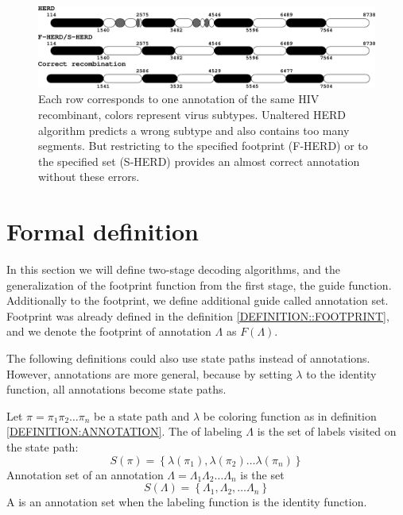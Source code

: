 \begin{figure}
\begin{center}
\includegraphics[width=14cm]{../figures/jcss/happyStory.pdf}
\end{center}
\caption[Example of annotation with systematic error.]{ 
Each row corresponds to one annotation of the same HIV recombinant, colors
represent virus subtypes. Unaltered HERD algorithm predicts a wrong
subtype and also contains too many segments. But restricting to the specified
footprint (F-HERD) or to the specified set (S-HERD) provides an almost correct
annotation without these errors.  }\label{FIGURE:HERD_BAD} 
\end{figure}

\section{Formal definition}
In this section we will define two-stage decoding algorithms, and the
generalization of the footprint function from the first stage, the guide
function. Additionally to the footprint, we define additional guide called
annotation set. Footprint was already defined in the definition
\ref{DEFINITION::FOOTPRINT}, and we denote the footprint of annotation
$\Lambda$ as $F(\Lambda)$. 

\begin{note}
The following definitions could also use state paths instead of 
annotations. However, annotations are more general, because by setting
$\lambda$ to the identity function, all annotations become state paths.
\end{note}

\begin{definition}
Let $\pi = \pi_1\pi_2\dots \pi_n$ be a state path and $\lambda$ be coloring
function as in definition \ref{DEFINITION:ANNOTATION}.  The
 of labeling $\Lambda$ is the set of labels visited
on the state path:
\[S(\pi) = \left\{\lambda(\pi_1), \lambda(\pi_2)\dots\lambda(\pi_n)\right\}\]
Annotation set of an annotation $\Lambda = \Lambda_1\Lambda_2\dots \Lambda_n$
is the set
\[S(\Lambda) =
\left\{\Lambda_1,\Lambda_2,\dots\Lambda_n\right\}\]
A  is an annotation set when the labeling function is the
identity function.\label{DEFINITION:ANNOTATION_SET}
\end{definition}

